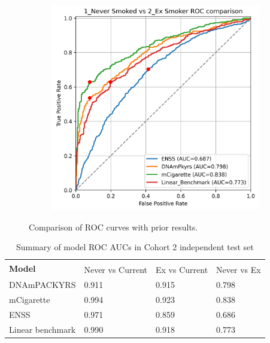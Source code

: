 \documentclass{article} %
\begin{document}
\begin{figure}[htb]
\begin{subfigure}{0.48\linewidth}
    \end{subfigure}
    \begin{subfigure}{0.48\linewidth}
        \centering
        \includegraphics[width=\linewidth]{comparison_1v2.png}
    \end{subfigure}
    \caption[Comparison of ROC curves with prior results]{Comparison of ROC curves with prior results. }
    \label{fig:comparison-rocs}
\end{figure}

\begin{table}[b]
    \caption{Summary of model ROC AUCs in Cohort 2 independent test set} \label{table:auc-comparison}
    \begin{tabularx}{\textwidth}{X >{\centering\arraybackslash}X >{\centering\arraybackslash}X >{\centering\arraybackslash}X}
        \toprule
        \multirow{2}{*}{\textbf{Model}} & \multicolumn{3}{c}{\textbf{AUC}}                               \\
        \cmidrule(lr){2-4}
                                        & Never vs Current                 & Ex vs Current & Never vs Ex \\
        \midrule
        DNAmPACKYRS                     & \num{0.911}                      & \num{0.915}   & \num{0.798} \\
        \addlinespace
        mCigarette                      & \num{0.994}                      & \num{0.923}   & \num{0.838} \\
        \addlinespace
        ENSS                            & \num{0.971}                      & \num{0.859}   & \num{0.686} \\
        \addlinespace
        Linear benchmark                & \num{0.990}                      & \num{0.918}   & \num{0.773} \\
        \bottomrule
    \end{tabularx}
\end{table}
\end{document}
